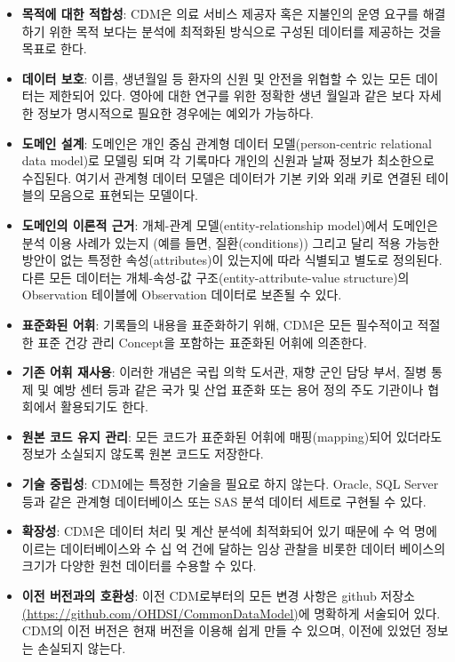 \documentclass[11pt]{book}
\providecommand{\tightlist}{%
  \setlength{\itemsep}{0pt}\setlength{\parskip}{0pt}}
\theoremstyle{definition}
\theoremstyle{definition}
\theoremstyle{definition}
\theoremstyle{remark}
\begin{document}
\begin{itemize}
\tightlist
\item
  \textbf{목적에 대한 적합성}: CDM은 의료 서비스 제공자 혹은 지불인의
  운영 요구를 해결하기 위한 목적 보다는 분석에 최적화된 방식으로 구성된
  데이터를 제공하는 것을 목표로 한다.
\item
  \textbf{데이터 보호}: 이름, 생년월일 등 환자의 신원 및 안전을 위협할
  수 있는 모든 데이터는 제한되어 있다. 영아에 대한 연구를 위한 정확한
  생년 월일과 같은 보다 자세한 정보가 명시적으로 필요한 경우에는 예외가
  가능하다.
\item
  \textbf{도메인 설계}: 도메인은 개인 중심 관계형 데이터
  모델(person-centric relational data model)로 모델링 되며 각 기록마다
  개인의 신원과 날짜 정보가 최소한으로 수집된다. 여기서 관계형 데이터
  모델은 데이터가 기본 키와 외래 키로 연결된 테이블의 모음으로 표현되는
  모델이다.
\item
  \textbf{도메인의 이론적 근거}: 개체-관계 모델(entity-relationship
  model)에서 도메인은 분석 이용 사례가 있는지 (예를 들면,
  질환(conditions)) 그리고 달리 적용 가능한 방안이 없는 특정한
  속성(attributes)이 있는지에 따라 식별되고 별도로 정의된다. 다른 모든
  데이터는 개체-속성-값 구조(entity-attribute-value structure)의
  Observation 테이블에 Observation 데이터로 보존될 수 있다.
\item
  \textbf{표준화된 어휘}: 기록들의 내용을 표준화하기 위해, CDM은 모든
  필수적이고 적절한 표준 건강 관리 Concept을 포함하는 표준화된 어휘에
  의존한다.
\item
  \textbf{기존 어휘 재사용}: 이러한 개념은 국립 의학 도서관, 재향 군인
  담당 부서, 질병 통제 및 예방 센터 등과 같은 국가 및 산업 표준화 또는
  용어 정의 주도 기관이나 협회에서 활용되기도 한다.
\item
  \textbf{원본 코드 유지 관리}: 모든 코드가 표준화된 어휘에
  매핑(mapping)되어 있더라도 정보가 소실되지 않도록 원본 코드도
  저장한다. 
\item
  \textbf{기술 중립성}: CDM에는 특정한 기술을 필요로 하지 않는다.
  Oracle, SQL Server 등과 같은 관계형 데이터베이스 또는 SAS 분석 데이터
  세트로 구현될 수 있다. 
\item
  \textbf{확장성}: CDM은 데이터 처리 및 계산 분석에 최적화되어 있기
  때문에 수 억 명에 이르는 데이터베이스와 수 십 억 건에 달하는 임상
  관찰을 비롯한 데이터 베이스의 크기가 다양한 원천 데이터를 수용할 수
  있다. 
\item
  \textbf{이전 버전과의 호환성}: 이전 CDM로부터의 모든 변경 사항은
  github 저장소
  \href{https://github.com/OHDSI/CommonDataModel}{(https://github.com/OHDSI/CommonDataModel)}에
  명확하게 서술되어 있다. CDM의 이전 버전은 현재 버전을 이용해 쉽게 만들
  수 있으며, 이전에 있었던 정보는 손실되지 않는다.
\end{itemize}
\end{document}
